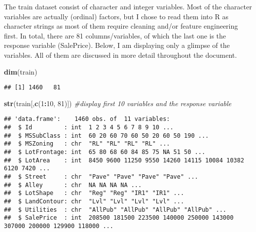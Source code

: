 \documentclass[]{article}
\newenvironment{Shaded}{\begin{snugshade}}{\end{snugshade}}
\newcommand{\KeywordTok}[1]{\textcolor[rgb]{0.13,0.29,0.53}{\textbf{#1}}}
\newcommand{\DecValTok}[1]{\textcolor[rgb]{0.00,0.00,0.81}{#1}}
\newcommand{\StringTok}[1]{\textcolor[rgb]{0.31,0.60,0.02}{#1}}
\newcommand{\CommentTok}[1]{\textcolor[rgb]{0.56,0.35,0.01}{\textit{#1}}}
\newcommand{\OtherTok}[1]{\textcolor[rgb]{0.56,0.35,0.01}{#1}}
\newcommand{\OperatorTok}[1]{\textcolor[rgb]{0.81,0.36,0.00}{\textbf{#1}}}
\newcommand{\NormalTok}[1]{#1}
\begin{document}
The train dataset consist of character and integer variables. Most of
the character variables are actually (ordinal) factors, but I chose to
read them into R as character strings as most of them require cleaning
and/or feature engineering first. In total, there are 81
columns/variables, of which the last one is the response variable
(SalePrice). Below, I am displaying only a glimpse of the variables. All
of them are discussed in more detail throughout the document.

\begin{Shaded}
\begin{Highlighting}[]
\KeywordTok{dim}\NormalTok{(train)}
\end{Highlighting}
\end{Shaded}

\begin{verbatim}
## [1] 1460   81
\end{verbatim}

\begin{Shaded}
\begin{Highlighting}[]
\KeywordTok{str}\NormalTok{(train[,}\KeywordTok{c}\NormalTok{(}\DecValTok{1}\OperatorTok{:}\DecValTok{10}\NormalTok{, }\DecValTok{81}\NormalTok{)]) }\CommentTok{#display first 10 variables and the response variable}
\end{Highlighting}
\end{Shaded}

\begin{verbatim}
## 'data.frame':    1460 obs. of  11 variables:
##  $ Id         : int  1 2 3 4 5 6 7 8 9 10 ...
##  $ MSSubClass : int  60 20 60 70 60 50 20 60 50 190 ...
##  $ MSZoning   : chr  "RL" "RL" "RL" "RL" ...
##  $ LotFrontage: int  65 80 68 60 84 85 75 NA 51 50 ...
##  $ LotArea    : int  8450 9600 11250 9550 14260 14115 10084 10382 6120 7420 ...
##  $ Street     : chr  "Pave" "Pave" "Pave" "Pave" ...
##  $ Alley      : chr  NA NA NA NA ...
##  $ LotShape   : chr  "Reg" "Reg" "IR1" "IR1" ...
##  $ LandContour: chr  "Lvl" "Lvl" "Lvl" "Lvl" ...
##  $ Utilities  : chr  "AllPub" "AllPub" "AllPub" "AllPub" ...
##  $ SalePrice  : int  208500 181500 223500 140000 250000 143000 307000 200000 129900 118000 ...
\end{verbatim}

\begin{Shaded}
\end{Shaded}
\end{document}
